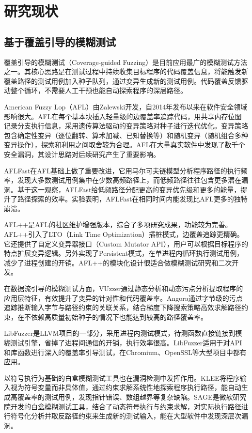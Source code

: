 \documentclass[bachelor]{njupthesis}
\begin{document}
\section{研究现状}

\subsection{基于覆盖引导的模糊测试}

覆盖引导的模糊测试（Coverage-guided Fuzzing）是目前应用最广的模糊测试方法之一。其核心思路是在测试过程中持续收集目标程序的代码覆盖信息，将能触发新覆盖路径的测试用例加入种子队列，通过变异生成新的测试用例。代码覆盖反馈驱动整个循环，不需要人工干预也能自动探索程序的深层路径。

American Fuzzy Lop（AFL）由Zalewski开发\cite{AFL}，自2014年发布以来在软件安全领域影响很大。AFL在每个基本块插入轻量级的边覆盖率追踪代码，用共享内存位图记录分支执行信息，采用遗传算法驱动的变异策略对种子进行迭代优化。变异策略包含确定性变异（逐位翻转、算术加减、已知替换等）和随机变异（随机组合多种变异操作），探索和利用之间取舍较为合理。AFL在大量真实软件中发现了数千个安全漏洞，其设计思路对后续研究产生了重要影响。

AFLFast\cite{AFLFAST}在AFL基础上做了重要改进，它用马尔可夫链模型分析程序路径的执行频率，发现大多数测试用例集中在少数高频路径上，而低频路径往往包含更多潜在漏洞。基于这一观察，AFLFast给低频路径分配更高的变异优先级和更多的能量，提升了路径探索的效率。实验表明，AFLFast在相同时间内能发现比AFL更多的独特崩溃。

AFL++\cite{AFLPLUSPLUS}是AFL的社区维护增强版本，综合了多项研究成果，功能较为完善。AFL++引入了LTO（Link Time Optimization）插桩模式，边覆盖追踪更精确。它还提供了自定义变异器接口（Custom Mutator API），用户可以根据目标程序的特点扩展变异逻辑。另外实现了Persistent模式，在单进程内循环执行测试用例，减少了进程创建的开销。AFL++的模块化设计很适合做模糊测试研究和二次开发。

在数据流引导的模糊测试方面，VUzzer\cite{VUzzer}通过静态分析和动态污点分析提取程序的应用层特征，有效提升了变异的针对性和代码覆盖率。Angora\cite{Angora}通过字节级的污点追踪推断输入字节与路径约束的关联关系，结合梯度下降搜索策略高效求解路径约束，在不依赖高质量初始种子的情况下也能达到较高的路径覆盖率。

LibFuzzer\cite{LIBFUZZER}是LLVM项目的一部分，采用进程内测试模式，待测函数直接链接到模糊测试引擎，省掉了进程间通信的开销，执行效率很高。LibFuzzer适用于对API和库函数进行深入的覆盖率引导测试，在Chromium、OpenSSL等大型项目中都有应用。

以符号执行为基础的白盒模糊测试工具也在漏洞检测中发挥作用。KLEE\cite{klee}将程序输入视为符号变量而非具体值，通过约束求解系统性地探索程序执行路径，能自动生成高覆盖率的测试用例，发现指针错误、数组越界等复杂缺陷。SAGE\cite{sage}是微软研究院开发的白盒模糊测试工具，结合了动态符号执行与约束求解，对实际执行路径进行符号化分析并取反路径约束来生成新的测试输入，能在大型软件中发现深层次漏洞。
\end{document}
